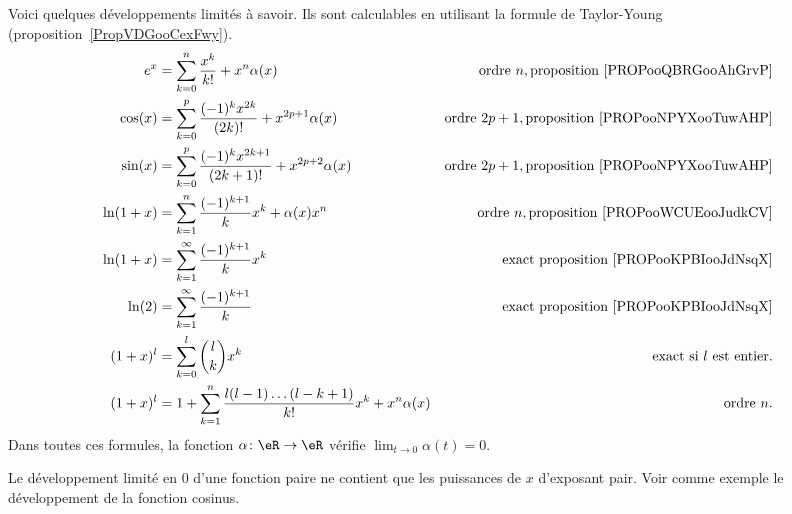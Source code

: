 \begin{description}
		Voici quelques développements limités à savoir. Ils sont calculables en utilisant la formule de Taylor-Young (proposition~\ref{PropVDGooCexFwy}).
		\begin{subequations}
			\begin{align*}
				e^x      & =\sum_{k=0}^n\frac{ x^k }{ k! }+x^n\alpha(x)                      & \text{ordre } n, \text{proposition \ref{PROPooQBRGooAhGrvP}}   \\
				\cos(x)  & =\sum_{k=0}^p\frac{ (-1)^kx^{2k} }{ (2k)! }+x^{2p+1}\alpha(x)     & \text{ordre } 2p+1,\text{proposition \ref{PROPooNPYXooTuwAHP}} \\
				\sin(x)  & =\sum_{k=0}^p\frac{ (-1)^kx^{2k+1} }{ (2k+1)! }+x^{2p+2}\alpha(x) & \text{ordre } 2p+1,\text{proposition \ref{PROPooNPYXooTuwAHP}} \\
				\ln(1+x) & =\sum_{k=1}^n\frac{ (-1)^{k+1} }{ k }x^k+\alpha(x)x^n             & \text{ordre }n,\text{proposition \ref{PROPooWCUEooJudkCV}}     \\
				\ln(1+x) & =\sum_{k=1}^{\infty}\frac{ (-1)^{k+1} }{ k }x^k                   & \text{exact }\text{proposition \ref{PROPooKPBIooJdNsqX}}       \\
				\ln(2)   & =\sum_{k=1}^{\infty}\frac{ (-1)^{k+1} }{ k }                      & \text{exact }\text{proposition \ref{PROPooKPBIooJdNsqX}}       \\
				(1+x)^l  & =\sum_{k=0}^l\binom{ l }{ k }x^k                                  & \text{exact si } l\text{ est entier.}                          \\
				(1+x)^l  & =1+\sum_{k=1}^n\frac{l(l-1)\ldots(l-k+1) }{ k! }x^k+x^n\alpha(x)  & \text{ordre } n.
			\end{align*}
		\end{subequations}
		Dans toutes ces formules, la fonction \( \alpha\colon \eR\to \eR\) vérifie \( \lim_{t\to 0} \alpha(t)=0\).

		Le développement limité en \( 0\) d'une fonction paire ne contient que les puissances de \( x\) d'exposant pair. Voir comme exemple le développement de la fonction cosinus.

\end{description}
